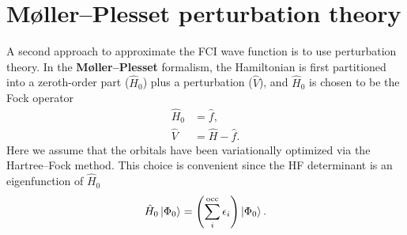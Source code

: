 \documentclass[../Main/chem532-notes.tex]{subfiles}
\begin{document}
\section{M{\o}ller--Plesset perturbation theory}
A second approach to approximate the FCI wave function is to use perturbation theory. In the \textbf{M{\o}ller--Plesset} formalism, the Hamiltonian is first partitioned into a zeroth-order part ($\hat{H}_0$) plus a perturbation ($\hat{V}$), and  $\hat{H}_0$ is chosen to be the Fock operator
\begin{align}
\hat{H}_0  & = \hat{f},\\
\hat{V}  & = \hat{H} - \hat{f}.
\end{align}
Here we assume that the orbitals have been variationally optimized via the Hartree--Fock method.
This choice is convenient since the HF determinant is an eigenfunction of $\hat{H}_0$
\begin{equation}
\hat{H}_0\ket{\Phi_0} = \left(\sum_i^{\mathrm{occ}} \epsilon_i\right) \ket{\Phi_0}.
\end{equation}
\end{document}

